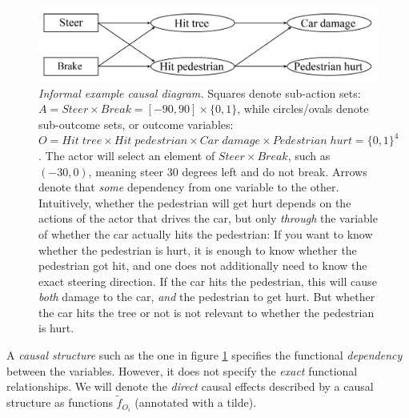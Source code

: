 \begin{figure}[H]
	\centering
	\captionsetup{labelfont=bf,font=small,labelsep=period}
	\includegraphics[width=0.7\linewidth]{"images/diagramexplanations/causaldiagramexplanation"}
	\caption{\rightskip=20pt\leftskip=20pt \textit{Informal example causal diagram.} Squares denote sub-action sets: $A=Steer\times Break=[-90,90]\times \{0,1\}$, while circles/ovals denote sub-outcome sets, or outcome variables: $O=Hit\;tree \times Hit\;pedestrian \times Car\;damage \times Pedestrian\;hurt=\{0,1\}^4$. The actor will select an element of $Steer\times Break$, such as $(-30,0)$, meaning steer $30$ degrees left and do not break. Arrows denote that \textit{some} dependency from one variable to the other. Intuitively, whether the pedestrian will get hurt depends on the actions of the actor that drives the car, but only \textit{through} the variable of whether the car actually hits the pedestrian: If you want to know whether the pedestrian is hurt, it is enough to know whether the pedestrian got hit, and one does not additionally need to know the exact steering direction. If the car hits the pedestrian, this will cause \textit{both} damage to the car, \textit{and} the pedestrian to get hurt. But whether the car hits the tree or not is not relevant to whether the pedestrian is hurt. 
	}
	\label{fig:causaldiagramexplanation} 	
\end{figure}








A \textit{causal structure} such as the one in figure \ref{fig:causaldiagramexplanation} specifies the functional \textit{dependency} between the variables. However, it does not specify the \textit{exact} functional relationships. We will denote the \textit{direct} causal effects described by a causal structure as functions $\tilde f_{O_i}$ (annotated with a tilde).





